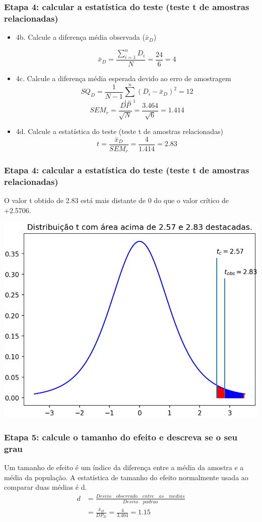 \documentclass[11pt]{beamer}
\begin{document}
\begin{frame}
\frametitle{Etapa 4: calcular a estatística do teste (teste t de amostras relacionadas)}
\begin{itemize}
\item 4b. Calcule a diferença média observada ($\bar{x}_D$)

\[\bar{x}_D = \frac{\sum_{i=1}^n D_i}{N} = \frac{24}{6} = 4\]

\item 4c. Calcule a diferença média esperada devido ao erro de amostragem
\[SQ_D = \frac{1}{N-1}\sum_{i=1}^n(D_i - \bar{x}_D)^2 = 12\]
\[SEM_r = \frac{DP}{\sqrt{N}} = \frac{3.464}{\sqrt{6}} = 1.414\]
\item 4d. Calcule a estatística do teste (teste t de amostras relacionadas)
\[t =  \frac{\bar{x}_D}{SEM_r}  = \frac{4}{1.414} = 2.83\]
\end{itemize}
\end{frame}

\begin{frame}
\frametitle{Etapa 4: calcular a estatística do teste (teste t de amostras relacionadas)}
O valor t obtido de 2.83 está mais distante de 0 do que o valor crítico de +2.5706.
\begin{center}\includegraphics[width=0.55\linewidth]{figs/regiao_critica_observada_t_rel} \end{center}

\end{frame}


\begin{frame}
\frametitle{Etapa 5: calcule o tamanho do efeito e descreva se o seu grau}
Um tamanho de efeito é um índice da diferença entre a média da amostra e a média da população. A estatística de tamanho do efeito normalmente usada ao comparar duas médias é d. 
\begin{align*}
d &= \frac{Desvio\quad observado\quad entre\quad as\quad medias}{Desvio\quad padrao}\\
  &= \frac{\bar{x}_D}{DP_D} = \frac{4}{3.464} = 1.15
\end{align*}

\end{frame}
\end{document}
